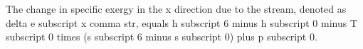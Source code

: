 The change in specific exergy in the x direction due to the stream, denoted as delta e subscript x comma str, equals h subscript 6 minus h subscript 0 minus T subscript 0 times (s subscript 6 minus s subscript 0) plus p subscript 0.